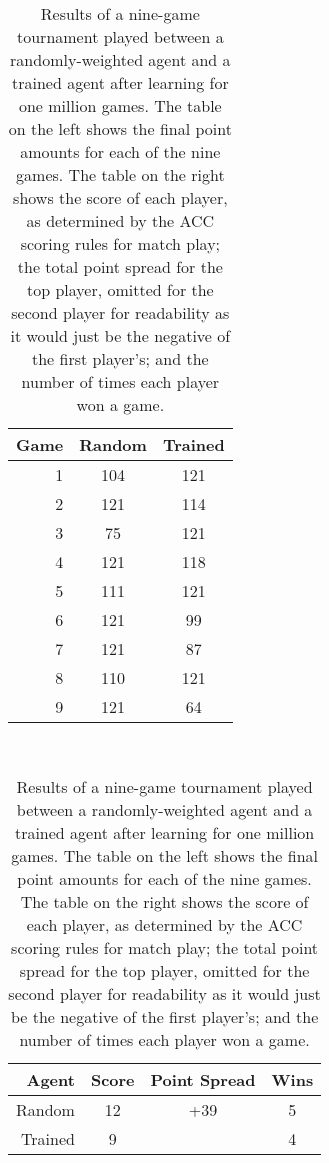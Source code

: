 
\begin{table}
\center
\begin{tabular}{|r|c|c|}
	\hline
	\textbf{Game} & \textbf{Random} & \textbf{Trained}\\\hline

	1 & 104 & 121 \\\hline
	2 & 121 & 114 \\\hline
	3 &  75 & 121 \\\hline
	4 & 121 & 118 \\\hline
	5 & 111 & 121 \\\hline
	6 & 121 &  99 \\\hline
	7 & 121 &  87 \\\hline
	8 & 110 & 121 \\\hline
	9 & 121 &  64 \\\hline

\end{tabular}
~
\begin{tabular}{|r|c|c|c|}
	\hline
	\textbf{Agent} & \textbf{Score} & \textbf{Point Spread} & \textbf{Wins}
	\\\hline
	Random & 12 & +39 & 5
	\\\hline
	Trained  & 9 & \textemdash & 4
	\\\hline
\end{tabular}

\caption{
	Results of a nine-game tournament played between
	a randomly-weighted agent
	and
	a trained agent after learning for one million games.
	The table on the left shows the final point amounts for each of the nine
	games.
	The table on the right shows the score of each player,
	as determined by the ACC scoring rules for match play;
	the total point spread for the top player,
	omitted for the second player for readability
	as it would just be the negative of the first player's;
	and the number of times each player won a game.
}

\label{tab_r1-randtourny}

\end{table}
